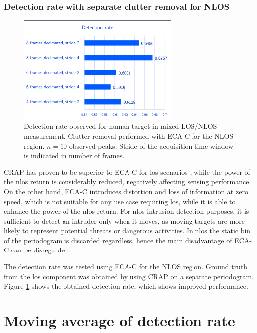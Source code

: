 \subsubsection{Detection rate with separate clutter removal for NLOS}

\begin{figure}[H]
	\centering
	\includegraphics[width=0.7\textwidth]{Images/Test1/detect_hist/detect_hist_human_ECAC_LMsans.png}
	\caption{\small Detection rate observed for human target in mixed LOS/NLOS measurement. Clutter removal performed with ECA-C for the NLOS region. $n=10$ observed peaks. Stride of the acquisition time-window is indicated in number of frames.}
	\label{fig:Test1_detect_hist_crap-ecac}
\end{figure}
CRAP has proven to be superior to ECA-C for \gls{los} scenarios \cite{Henninger_CRAP_2023}, while the power of the \gls{nlos} return is considerably reduced, negatively affecting sensing performance.
On the other hand, ECA-C introduces distortion and loss of information at zero speed, which is not suitable for any use case requiring \gls{los}, while it is able to enhance the power of the \gls{nlos} return. For \gls{nlos} intrusion detection purposes, it is sufficient to detect an intruder only when it moves, as moving targets are more likely to represent potential threats or dangerous activities.
In \gls{nlos} the static bin of the periodogram is discarded regardless, hence the main disadvantage of ECA-C can be disregarded.

The detection rate was tested using ECA-C for the NLOS region.
Ground truth from the \gls{los} component was obtained by using CRAP on a separate periodogram.
Figure \ref{fig:Test1_detect_hist_crap-ecac} shows the obtained detection rate, which shows improved performance.


\section{Moving average of detection rate}

